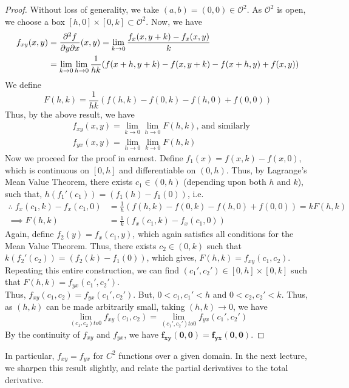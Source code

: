 \documentclass[../Analysis-3.tex]{subfiles}
\begin{document}
\begin{proof}
  Without loss of generality, we take $(a,b) = (0,0) \in \mathcal{O}^2$. As $\mathcal{O}^2$ is open, we choose a box $[h,0]\times [0,k] \subset \mathcal{O}^2$. Now, we have
  \begin{align*}
    f_{xy}(x,y) & = \pdv{f}{y}{x}\/(x,y) = \lim_{k \to 0} \frac{f_x(x,y+k) - f_x(x,y)}{k}                \\
                & = \lim_{k \to 0} \lim_{h \to 0} \frac{1}{hk}(f(x+h,y+k) - f(x,y+k) - f(x+h,y)+ f(x,y))
  \end{align*}
  We define
  \[F(h,k) = \frac{1}{hk}(f(h,k) - f(0,k) - f(h,0)+ f(0,0))\]
  Thus, by the above result, we have
  \begin{align*}
     & f_{xy}(x,y) = \lim_{k \to 0} \lim_{h \to 0} F(h,k) \text{, and similarly} \\ &f_{yx}(x,y) = \lim_{h \to 0} \lim_{k \to 0} F(h,k)
  \end{align*}
  Now we proceed for the proof in earnest. Define $f_1(x) = f(x,k) - f(x,0)$, which is continuous on $[0,h]$ and differentiable on $(0,h)$. Thus, by Lagrange's Mean Value Theorem, there exists $c_1 \in (0,h)$ (depending upon both $h$ and $k$), such that, $h(f_1'(c_1)) = (f_1(h) - f_1(0))$, i.e.
  \begin{align*}
    \therefore\; f_x(c_1,k) - f_x(c_1,0) & =  \frac{1}{h}(f(h,k) - f(0,k) - f(h,0)+ f(0,0)) = kF(h,k) \\
    \implies F(h,k)                      & = \frac{1}{k}(f_x(c_1,k) - f_x(c_1,0))
  \end{align*}
  Again, define $f_2(y) = f_x(c_1,y)$, which again satisfies all conditions for the Mean Value Theorem. Thus, there exists $c_2 \in (0,k)$ such that $k(f_2'(c_2)) = (f_2(k) - f_1(0))$, which gives, $F(h,k) = f_{xy}(c_1, c_2)$.\\
  Repeating this entire construction, we can find $(c_1', c_2') \in [0,h]\times[0,k]$ such that $F(h,k) = f_{yx}(c_1', c_2')$.\\
  Thus, $f_{xy}(c_1, c_2) = f_{yx}(c_1', c_2')$. But, $0 < c_1, c_1' < h$ and $0 < c_2, c_2' < k$. Thus, as $(h,k)$ can be made arbitrarily small, taking  $(h,k) \to 0$, we have
  \[
    \lim_{(c_1, c_2) to 0} f_{xy}(c_1, c_2) = \lim_{(c_1', c_2') to 0} f_{yx}(c_1', c_2')
  \]
  By the continuity of $f_{xy}$ and $f_{yx}$, we have $\mathbf{f_{xy}(0,0) = f_{yx}(0,0)}$.

\end{proof}
\vspace{.2 cm}

In particular, $f_{xy} = f_{yx}$ for $C^2$ functions over a given domain. In the next lecture, we sharpen this result slightly, and relate the  partial derivatives to the total derivative.
\end{document}
